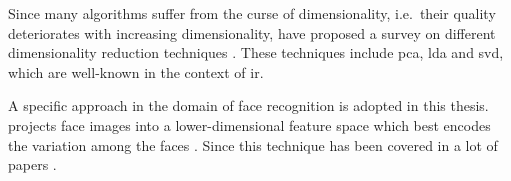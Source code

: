 Since many algorithms suffer from the curse of dimensionality, i.e.\ their quality deteriorates with increasing dimensionality, 
\citeauthor{dim_reduction2021} have proposed a survey on different dimensionality reduction techniques \cite{dim_reduction2021}.
These techniques include \ac{pca}, \ac{lda} and \ac{svd}, which are well-known in the context of \ac{ir}.


A specific approach in the domain of face recognition is adopted in this thesis.
\eigenfaces{} projects face images into a lower-dimensional feature space which best encodes the variation among the faces \cite{eigenfaces1991}.
Since \citeyear{eigenfaces1991} this technique has been covered in a lot of papers 
\cite{eigenfaces1991, eigenfaces1997, eigenfaces2013, face-recognition2008, face-recognition2020, face-recognition2021}.